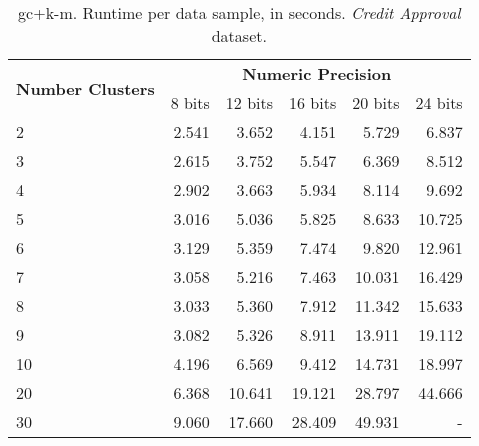 \begin{table}[h]
\centering
\caption{\acs{gc}+\acs{k-m}. Runtime per data sample, in seconds. \emph{Credit Approval} dataset.}
\label{table:runtimeKMCA}
\vspace*{0.2cm}
\begin{tabular}{|l|r|r|r|r|r|}
\hline
\multirow{2}{*}{\textbf{Number Clusters}} & \multicolumn{5}{c|}{\textbf{Numeric Precision}}                                              \\ \cline{2-6}
                                          & 8 bits & 12 bits & 16 bits & 20 bits & 24 bits \\ \hline
2                                & 2.541           & 3.652            & 4.151            & 5.729            & 6.837            \\ \hline
3                                & 2.615           & 3.752            & 5.547            & 6.369            & 8.512            \\ \hline
4                                & 2.902           & 3.663            & 5.934            & 8.114            & 9.692            \\ \hline
5                                & 3.016           & 5.036            & 5.825            & 8.633            & 10.725           \\ \hline
6                                & 3.129           & 5.359            & 7.474            & 9.820            & 12.961           \\ \hline
7                                & 3.058           & 5.216            & 7.463            & 10.031           & 16.429           \\ \hline
8                                & 3.033           & 5.360            & 7.912            & 11.342           & 15.633           \\ \hline
9                                & 3.082           & 5.326            & 8.911            & 13.911           & 19.112           \\ \hline
10                               & 4.196           & 6.569            & 9.412            & 14.731           & 18.997           \\ \hline
20                               & 6.368           & 10.641           & 19.121           & 28.797           & 44.666           \\ \hline
30                               & 9.060           & 17.660           & 28.409           & 49.931           & -                \\ \hline

\end{tabular}
\end{table}
